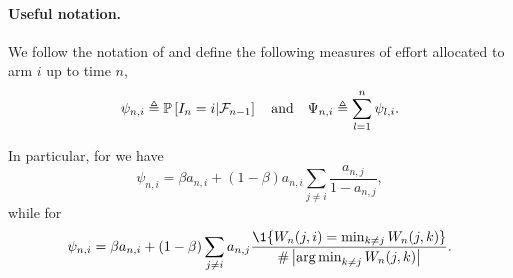 \paragraph{Useful notation.}



We follow the notation of \citet{russo2016ttts} and define the following measures of effort allocated to arm $i$ up to time $n$,
\begin{align*}
    \psi_{n,i} \triangleq \mathbb{P}\left[I_n = i | \mathcal{F}_{n-1}\right]\quad \text{and} \quad \Psi_{n,i} \triangleq \sum_{l=1}^n \psi_{l,i}.
\end{align*}

In particular, for \TTTS we have
\[
    \psi_{n,i} =  \beta a_{n,i} + (1-\beta) a_{n,i}\sum_{j\neq i} \frac{a_{n,j}}{1-a_{n,j}},
\]
while for \TCC
\[
    \psi_{n,i} = \beta a_{n,i} + (1-\beta) \sum_{j\neq i} a_{n,j}\frac{\1\{W_n(j,i)=\min_{k\neq j} W_n(j,k)\}}{\#\left|\argmin_{k\neq j } W_n(j,k)\right|}.
\]
